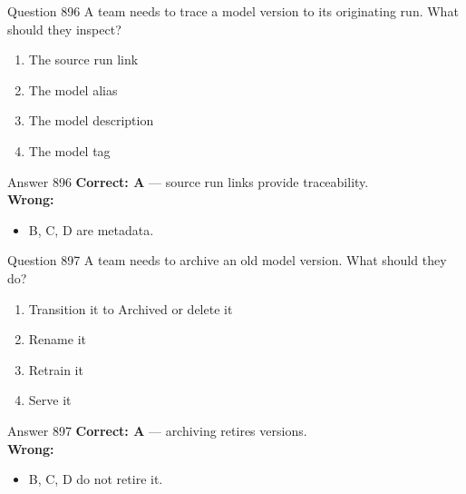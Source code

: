 \documentclass[aspectratio=169,11pt]{beamer}
\begin{document}
	\begin{frame}{Question 896}
		A team needs to trace a model version to its originating run. What should they inspect?
		\begin{enumerate}[label=\Alph*.]
			\item The source run link
			\item The model alias
			\item The model description
			\item The model tag
		\end{enumerate}
	\end{frame}
	\begin{frame}{Answer 896}
		\textbf{Correct: A} --- source run links provide traceability.\\
		\vspace{0.5em}
		\textbf{Wrong:}
		\begin{itemize}
			\item B, C, D are metadata.
		\end{itemize}
	\end{frame}
	
	\begin{frame}{Question 897}
		A team needs to archive an old model version. What should they do?
		\begin{enumerate}[label=\Alph*.]
			\item Transition it to Archived or delete it
			\item Rename it
			\item Retrain it
			\item Serve it
		\end{enumerate}
	\end{frame}
	\begin{frame}{Answer 897}
		\textbf{Correct: A} --- archiving retires versions.\\
		\vspace{0.5em}
		\textbf{Wrong:}
		\begin{itemize}
			\item B, C, D do not retire it.
		\end{itemize}
	\end{frame}
	
\end{document}
